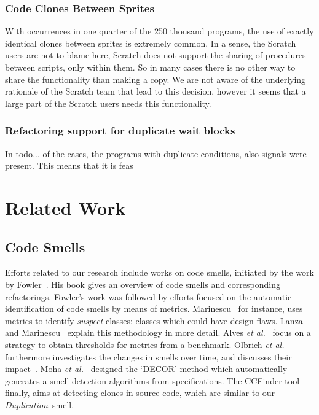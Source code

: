 \documentclass{sig-alternate}
\newcommand{\dup}{\emph{Duplication}~}
\begin{document}
\subsubsection{Code Clones Between Sprites}
With occurrences in one quarter of the 250 thousand programs, the use of exactly identical clones between sprites is extremely common. In a sense, the Scratch users are not to blame here, Scratch does not support the sharing of procedures between scripts, only within them. So in many cases there is no other way to share the functionality than making a copy. We are not aware of the underlying rationale of the Scratch team that lead to this decision, however it seems that a large part of the Scratch users needs this functionality. 

\subsubsection{Refactoring support for duplicate wait blocks}
In todo{...} of the cases, the programs with duplicate conditions, also signals were present. This means that it is feas




\section{Related Work}
\label{sec:related}

\subsection{Code Smells}
Efforts related to our research include works on code smells, initiated by the work by Fowler~\cite{fowler_refactoring:_1999}. His book gives an overview of code smells and corresponding refactorings. Fowler's work was followed by efforts focused on the automatic identification of code smells by means of metrics. Marinescu~\cite{marinescu_detecting_2001} for instance, uses metrics to identify \emph{suspect} classes: classes which could have design flaws. Lanza and Marinescu~\cite{lanza_object-oriented_2006} explain this methodology in more detail. Alves \emph{et al.}~\cite{alves_deriving_2010} focus on a strategy to obtain thresholds for metrics from a benchmark. Olbrich \emph{et al.} furthermore investigates the changes in smells over time, and discusses their impact~\cite{olbrich_evolution_2009}. Moha \emph{et al.}~\cite{moha_decor:_2010} designed the `DECOR' method which automatically generates a smell detection algorithms from specifications. The CCFinder tool~\cite{kamiya_ccfinder:_2002} finally, aims at detecting clones in source code, which are similar to our \dup smell.
\end{document}
